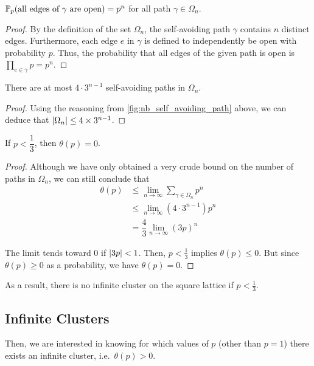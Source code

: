 \documentclass[a4paper, 12pt]{article}
\begin{document}
\begin{prop}\label{prop:p_path_all_open}
$\P(\text{all edges of } \gamma \text{ are open}) = p^n$ for all path $\gamma \in \Omega_n$.
\end{prop}
\begin{proof}
By the definition of the set $\Omega_n$, the self-avoiding path $\gamma$ contains $n$ distinct edges. Furthermore, each edge $e$ in $\gamma$ is defined to independently be open with probability $p$. Thus, the probability that all edges of the given path is open is $\prod_{e \in \gamma} p = p^n$.
\end{proof}

\begin{prop}\label{prop:nb_paths_len_n}
There are at most $4 \cdot 3^{n - 1}$ self-avoiding paths in $\Omega_n$.
\end{prop}

\begin{proof}
Using the reasoning from \cref{fig:nb_self_avoiding_path} above, we can deduce that $\abs{\Omega_n} \leq 4 \times 3^{n - 1}$.
\end{proof}

\begin{thm}\label{thm:pc_lower_bound}
If $p < \dfrac{1}{3}$, then $\theta(p) = 0$.
\end{thm}
\begin{proof}
Although we have only obtained a very crude bound on the number of paths in $\Omega_n$, we can still conclude that
\begin{align*}
    \theta(p)
    &\leq \lim_{n \to \infty} \sum_{\gamma \in \Omega_n} p^n\\
    &\leq \lim_{n \to \infty} \left(4 \cdot 3^{n - 1}\right) p^n\\
    &= \dfrac{4}{3} \lim_{n \to \infty} (3p)^n
\end{align*}

The limit tends toward 0 if $\abs{3p} < 1$. Then, $p < \frac{1}{3}$ implies $\theta(p) \leq 0$. But since $\theta(p) \geq 0$ as a probability, we have $\theta(p) = 0$.
\end{proof}

As a result, there is no infinite cluster on the square lattice if $p < \frac{1}{3}$.

\subsection{Infinite Clusters}\label{subsec:inf_cluster}
Then, we are interested in knowing for which values of $p$ (other than $p = 1$) there exists an infinite cluster, i.e.\ $\theta(p) > 0$.
\end{document}
